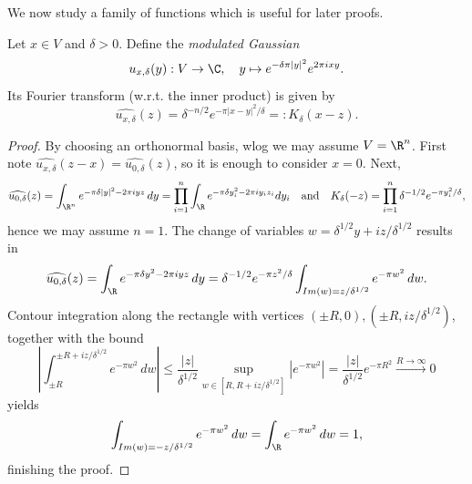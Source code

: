 We now study a family of functions which is useful for later proofs.
\begin{lemma}
\label{lem:fourier-gaussian}
\leanok
Let $x\in V$ and $\delta>0$. Define the \emph{modulated Gaussian}
$$u_{x,\delta}(y):V\to\C,\quad y\mapsto e^{-\delta\pi|y|^2}e^{2\pi i x y}.$$
Its Fourier transform (w.r.t. the inner product) is given by
$$\widehat{u_{x,\delta}}(z)=\delta^{-n/2}e^{-\pi|x-y|^2/\delta}=:K_\delta(x-z).$$
\end{lemma}
\begin{proof}
  \leanok
  By choosing an orthonormal basis, wlog we may assume $V=\R^n$.
  First note $\widehat{u_{x,\delta}}(z-x)=\widehat{u_{0,\delta}}(z)$, so it is enough to consider $x=0$.
  Next, $$\widehat{u_{0,\delta}}(z)=\int_{\R^n}e^{-\pi\delta|y|^2-2\pi iyz}\,dy=
  \prod_{i=1}^n\int_{\R}e^{-\pi\delta y_i^2-2\pi iy_iz_i}dy_i\quad\text{and}\quad
  K_\delta(-z)=\prod_{i=1}^n\delta^{-1/2}e^{-\pi y_i^2/\delta},$$ hence we may assume $n=1$.
  The change of variables $w=\delta^{1/2}y+iz/\delta^{1/2}$ results in
  $$\widehat{u_{0,\delta}}(z)=\int_{\R} e^{-\pi\delta y^2-2\pi i y z}\,dy=
  \delta^{-1/2}e^{-\pi z^2/\delta}\int_{Im(w)=z/\delta^{1/2}}e^{-\pi w^2}\,dw.$$
  Contour integration along the rectangle with vertices $(\pm R,0),(\pm R,iz/\delta^{1/2})$, together
  with the bound $$\left|\int_{\pm R}^{\pm R+iz/\delta^{1/2}}e^{-\pi w^2}\,dw\right|\leq
  \frac{|z|}{\delta^{1/2}}\sup_{w\in[R,R+iz/\delta^{1/2}]}|e^{-\pi w^2}|=
  \frac{|z|}{\delta^{1/2}}e^{-\pi R^2}\xrightarrow{R\to\infty}0$$
  yields
  $$\int_{Im(w)=-z/\delta^{1/2}}e^{-\pi w^2}\,dw=
  \int_{\R} e^{-\pi w^2}\,dw=1,$$ finishing the proof.
\end{proof}

